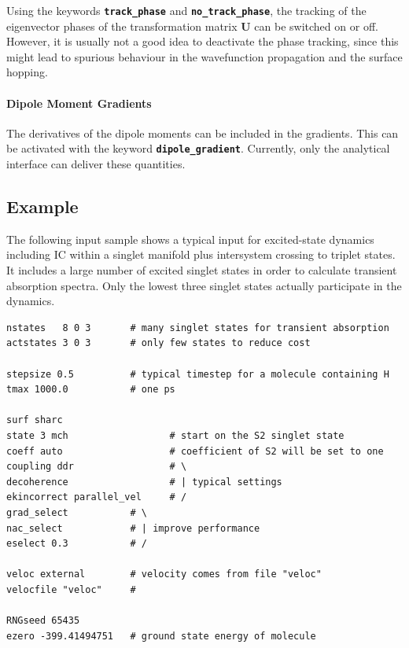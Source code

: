 \documentclass[a4paper,11pt,DIV=15,openany,twoside=false]{scrbook}
\newcommand{\ttt}[1]{\textbf{\texttt{#1}}}
\newenvironment{example}{
  \vspace{0mm}
  \definecolor{shadecolor}{HTML}{E4F4FF}
  \begin{shaded}
}{
  \end{shaded}
}
\begin{document}
Using the keywords \ttt{track\_phase} and \ttt{no\_track\_phase}, the tracking of the eigenvector phases of the transformation matrix $\mathbf{U}$ 
can be switched on or off. However, it is usually not a good idea to deactivate the phase tracking, since this might lead to spurious behaviour in the wavefunction propagation and the surface hopping.

\paragraph{Dipole Moment Gradients}

The derivatives of the dipole moments can be included in the gradients. This can be activated with the keyword \ttt{dipole\_gradient}. Currently, only the analytical interface can deliver these quantities.




\subsection{Example}

The following input sample shows a typical input for excited-state dynamics including IC within a singlet manifold plus intersystem crossing to triplet states. It includes a large number of excited singlet states in order to calculate transient absorption spectra. Only the lowest three singlet states actually participate in the dynamics. 

\begin{example}
  \begin{verbatim}
nstates   8 0 3       # many singlet states for transient absorption
actstates 3 0 3       # only few states to reduce cost

stepsize 0.5          # typical timestep for a molecule containing H
tmax 1000.0           # one ps

surf sharc
state 3 mch                  # start on the S2 singlet state
coeff auto                   # coefficient of S2 will be set to one
coupling ddr                 # \
decoherence                  # | typical settings
ekincorrect parallel_vel     # /
grad_select           # \
nac_select            # | improve performance
eselect 0.3           # /

veloc external        # velocity comes from file "veloc"
velocfile "veloc"     #

RNGseed 65435
ezero -399.41494751   # ground state energy of molecule
  \end{verbatim}
\end{example}
\end{document}
